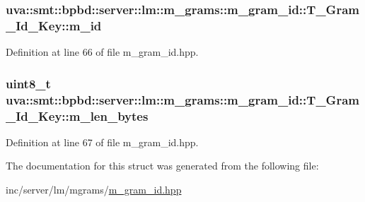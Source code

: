 \subsubsection[{m\+\_\+id}]{ uva\+::smt\+::bpbd\+::server\+::lm\+::m\+\_\+grams\+::m\+\_\+gram\+\_\+id\+::\+T\+\_\+\+Gram\+\_\+\+Id\+\_\+\+Key\+::m\+\_\+id}\label{structuva_1_1smt_1_1bpbd_1_1server_1_1lm_1_1m__grams_1_1m__gram__id_1_1_t___gram___id___key_a53b872f5e245de5fda3b7d28b8cdd992}


Definition at line 66 of file m\+\_\+gram\+\_\+id.\+hpp.

\hypertarget{structuva_1_1smt_1_1bpbd_1_1server_1_1lm_1_1m__grams_1_1m__gram__id_1_1_t___gram___id___key_ac8042d2fd320179861d548daa08b97d1}{}
\subsubsection[{m\+\_\+len\+\_\+bytes}]{\setlength{\rightskip}{0pt plus 5cm}uint8\+\_\+t uva\+::smt\+::bpbd\+::server\+::lm\+::m\+\_\+grams\+::m\+\_\+gram\+\_\+id\+::\+T\+\_\+\+Gram\+\_\+\+Id\+\_\+\+Key\+::m\+\_\+len\+\_\+bytes}\label{structuva_1_1smt_1_1bpbd_1_1server_1_1lm_1_1m__grams_1_1m__gram__id_1_1_t___gram___id___key_ac8042d2fd320179861d548daa08b97d1}


Definition at line 67 of file m\+\_\+gram\+\_\+id.\+hpp.



The documentation for this struct was generated from the following file\+:\begin{DoxyCompactItemize}
\item 
inc/server/lm/mgrams/\hyperlink{m__gram__id_8hpp}{m\+\_\+gram\+\_\+id.\+hpp}\end{DoxyCompactItemize}
